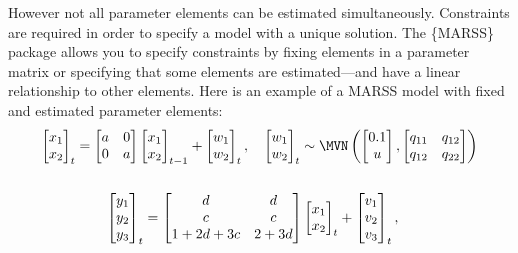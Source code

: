 However not all parameter elements can be estimated simultaneously. Constraints are required in order to specify a model with a unique solution. The \{MARSS\} package allows you to specify constraints by fixing elements in a parameter matrix or specifying that some elements are estimated---and have a linear relationship to other elements. Here is an example of a MARSS model with fixed and estimated parameter elements:
\begin{gather*}
\begin{bmatrix}x_1\\ x_2\end{bmatrix}_t
= \begin{bmatrix}a&0\\0&a\end{bmatrix}
\begin{bmatrix}x_1\\x_2\end{bmatrix}_{t-1}
+ \begin{bmatrix}w_1\\ w_2\end{bmatrix}_t,\quad 
\begin{bmatrix}w_1\\ w_2\end{bmatrix}_t \sim \MVN\begin{pmatrix}\begin{bmatrix}0.1\\u\end{bmatrix},\begin{bmatrix}q_{11}&q_{12}\\q_{12}&q_{22}\end{bmatrix} \end{pmatrix}  \\
\\
\begin{bmatrix}y_1\\ y_2\\ y_3\end{bmatrix}_t
= \begin{bmatrix}d&d\\ c& c\\ 1+2d+3c&2+3d\end{bmatrix}
\begin{bmatrix}x_1\\ x_2\end{bmatrix}_t
+ \begin{bmatrix}v_1\\ v_2\\ v_3\end{bmatrix}_t,\quad

\end{gather*}
